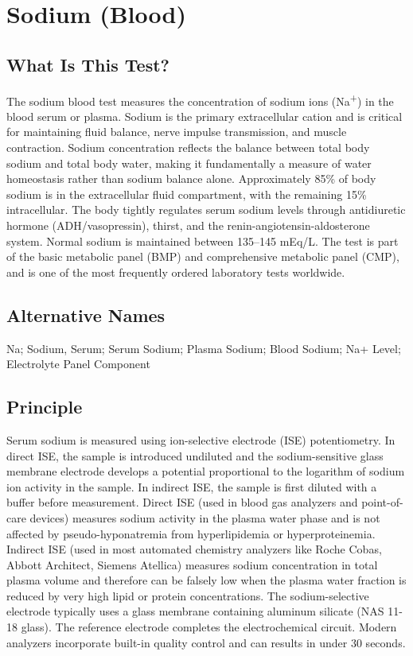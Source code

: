\chapter{Sodium (Blood)}

\section*{What Is This Test?}
The sodium blood test measures the concentration of sodium ions (Na\textsuperscript{+}) in the blood serum or plasma. Sodium is the primary extracellular cation and is critical for maintaining fluid balance, nerve impulse transmission, and muscle contraction. Sodium concentration reflects the balance between total body sodium and total body water, making it fundamentally a measure of water homeostasis rather than sodium balance alone. Approximately 85\% of body sodium is in the extracellular fluid compartment, with the remaining 15\% intracellular. The body tightly regulates serum sodium levels through antidiuretic hormone (ADH/vasopressin), thirst, and the renin-angiotensin-aldosterone system. Normal sodium is maintained between 135--145 mEq/L. The test is part of the basic metabolic panel (BMP) and comprehensive metabolic panel (CMP), and is one of the most frequently ordered laboratory tests worldwide.

\section*{Alternative Names}
Na; Sodium, Serum; Serum Sodium; Plasma Sodium; Blood Sodium; Na+ Level; Electrolyte Panel Component

\section*{Principle}
Serum sodium is measured using ion-selective electrode (ISE) potentiometry. In direct ISE, the sample is introduced undiluted and the sodium-sensitive glass membrane electrode develops a potential proportional to the logarithm of sodium ion activity in the sample. In indirect ISE, the sample is first diluted with a buffer before measurement. Direct ISE (used in blood gas analyzers and point-of-care devices) measures sodium activity in the plasma water phase and is not affected by pseudo-hyponatremia from hyperlipidemia or hyperproteinemia. Indirect ISE (used in most automated chemistry analyzers like Roche Cobas, Abbott Architect, Siemens Atellica) measures sodium concentration in total plasma volume and therefore can be falsely low when the plasma water fraction is reduced by very high lipid or protein concentrations. The sodium-selective electrode typically uses a glass membrane containing aluminum silicate (NAS 11-18 glass). The reference electrode completes the electrochemical circuit. Modern analyzers incorporate built-in quality control and can results in under 30 seconds.

